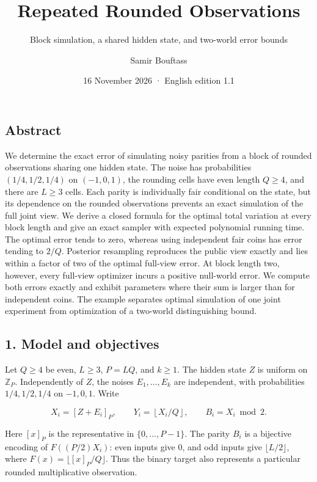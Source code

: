 \documentclass[
]{article}
\title{Repeated Rounded Observations}
\subtitle{Block simulation, a shared hidden state, and two-world error
bounds}
\author{Samir Bouftass}
\date{16 November 2026 · English edition 1.1}
\begin{document}
\maketitle

\subsection{Abstract}\label{abstract}

We determine the exact error of simulating noisy parities from a block
of rounded observations sharing one hidden state. The noise has
probabilities \((1/4,1/2,1/4)\) on \((-1,0,1)\), the rounding cells have
even length \(Q\ge4\), and there are \(L\ge3\) cells. Each parity is
individually fair conditional on the state, but its dependence on the
rounded observations prevents an exact simulation of the full joint
view. We derive a closed formula for the optimal total variation at
every block length and give an exact sampler with expected polynomial
running time. The optimal error tends to zero, whereas using independent
fair coins has error tending to \(2/Q\). Posterior resampling reproduces
the public view exactly and lies within a factor of two of the optimal
full-view error. At block length two, however, every full-view optimizer
incurs a positive null-world error. We compute both errors exactly and
exhibit parameters where their sum is larger than for independent coins.
The example separates optimal simulation of one joint experiment from
optimization of a two-world distinguishing bound.

\subsection{1. Model and objectives}\label{model-and-objectives}

Let \(Q\ge4\) be even, \(L\ge3\), \(P=LQ\), and \(k\ge1\). The hidden
state \(Z\) is uniform on \(\mathbb Z_P\). Independently of \(Z\), the
noises \(E_1,\ldots,E_k\) are independent, with probabilities
\(1/4,1/2,1/4\) on \(-1,0,1\). Write

\[
X_i=[Z+E_i]_P,\qquad Y_i=\left\lfloor X_i/Q\right\rfloor,
\qquad B_i=X_i\bmod2.
\tag{1}
\]

Here \([x]_P\) is the representative in \(\{0,\ldots,P-1\}\). The parity
\(B_i\) is a bijective encoding of \(F((P/2)X_i)\): even inputs give
\(0\), and odd inputs give \(\lfloor L/2\rfloor\), where
\(F(x)=\lfloor[x]_P/Q\rfloor\). Thus the binary target also represents a
particular rounded multiplicative observation.
\end{document}
